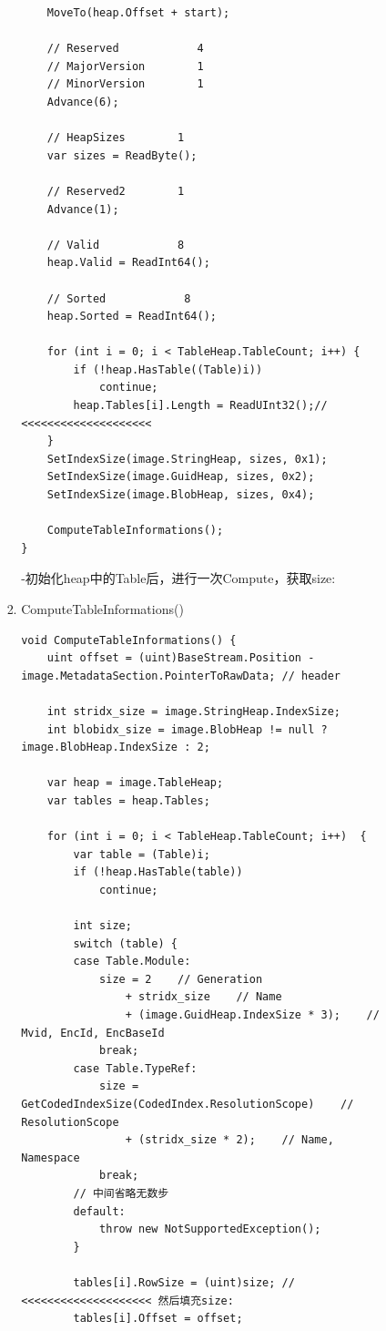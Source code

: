 \documentclass[9pt, b5paper]{article}
\begin{document}
\begin{enumerate}
\begin{enumerate}
\begin{enumerate}
\begin{enumerate}
\begin{verbatim}
    MoveTo(heap.Offset + start);

    // Reserved            4
    // MajorVersion        1
    // MinorVersion        1
    Advance(6);

    // HeapSizes        1
    var sizes = ReadByte();

    // Reserved2        1
    Advance(1);

    // Valid            8
    heap.Valid = ReadInt64();

    // Sorted            8
    heap.Sorted = ReadInt64();

    for (int i = 0; i < TableHeap.TableCount; i++) {
        if (!heap.HasTable((Table)i))
            continue;
        heap.Tables[i].Length = ReadUInt32();// <<<<<<<<<<<<<<<<<<<< 
    } 
    SetIndexSize(image.StringHeap, sizes, 0x1);
    SetIndexSize(image.GuidHeap, sizes, 0x2);
    SetIndexSize(image.BlobHeap, sizes, 0x4);

    ComputeTableInformations();
}
\end{verbatim}
-初始化heap中的Table后，进行一次Compute，获取size:
\item ComputeTableInformations()
\label{sec-9-1-3-1-3-4-2}
\begin{verbatim}
void ComputeTableInformations() {
    uint offset = (uint)BaseStream.Position - image.MetadataSection.PointerToRawData; // header

    int stridx_size = image.StringHeap.IndexSize;
    int blobidx_size = image.BlobHeap != null ? image.BlobHeap.IndexSize : 2;

    var heap = image.TableHeap;
    var tables = heap.Tables;

    for (int i = 0; i < TableHeap.TableCount; i++)  {
        var table = (Table)i;
        if (!heap.HasTable(table))
            continue;

        int size;
        switch (table) {
        case Table.Module:
            size = 2    // Generation
                + stridx_size    // Name
                + (image.GuidHeap.IndexSize * 3);    // Mvid, EncId, EncBaseId
            break;
        case Table.TypeRef:
            size = GetCodedIndexSize(CodedIndex.ResolutionScope)    // ResolutionScope
                + (stridx_size * 2);    // Name, Namespace
            break;
        // 中间省略无数步
        default:
            throw new NotSupportedException();
        }

        tables[i].RowSize = (uint)size; // <<<<<<<<<<<<<<<<<<<< 然后填充size:
        tables[i].Offset = offset;


\end{verbatim}
\end{enumerate}
\end{enumerate}
\end{enumerate}
\end{enumerate}
\end{document}
